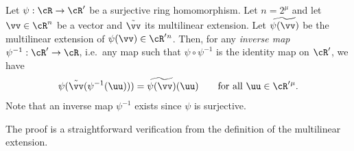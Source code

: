 \begin{lemma}\label{lem:mle_lifted_projection}
  Let $\psi:\cR\to\cR'$ be a surjective ring homomorphism. Let $n=2^\mu$ and let $\vv\in \cR^n$ be a vector and $\tilde{\vv}$ its multilinear extension. Let $\widetilde{\psi(\vv)}$ be the multilinear extension of $\psi(\vv)\in \cR'{}^n$. Then, for any \emph{inverse map} $\psi^{-1}:\cR'\to\cR$, i.e.\ any map such that $\psi\circ\psi^{-1}$ is the identity map on $\cR'$, we have
$$\psi(\tilde{\vv}(\psi^{-1}(\uu))) = \widetilde{\psi(\vv)}(\uu) \qquad \text{for all } \uu\in \cR'{}^\mu.$$ Note that an inverse map $\psi^{-1}$ exists since $\psi$ is surjective.
\end{lemma}
The proof is a straightforward verification from the definition of the multilinear extension.